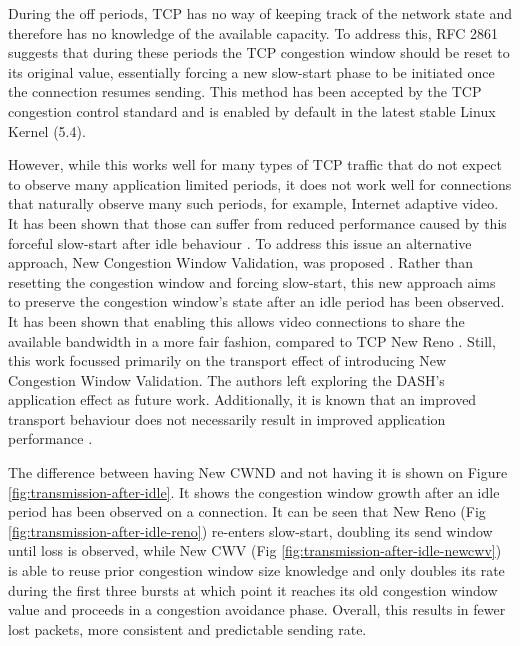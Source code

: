 \documentclass[10pt,sigconf]{acmart}
\begin{document}
During the off periods, TCP has no way of keeping track of the network state and therefore has no knowledge of the available capacity. To address this, RFC 2861 \cite{rfc2861-2000-padhye-congestion-window-validation} suggests that during these periods the TCP congestion window should be reset to its original value, essentially forcing a new slow-start phase to be initiated once the connection resumes sending. This method has been accepted by the TCP congestion control standard \cite{rfc5681-congeston-control} and is enabled by default in the latest stable Linux Kernel (5.4).

However, while this works well for many types of TCP traffic that do not expect to observe many application limited periods, it does not work well for connections that naturally observe many such periods, for example, Internet adaptive video. It has been shown that those can suffer from reduced performance caused by this forceful slow-start after idle behaviour \cite{Esteban-2012-Interactions-HTTP-TCP}. To address this issue an alternative approach, New Congestion Window Validation, was proposed \cite{rfc7661-2015-fairhurst-new-cwnd-validation}. Rather than resetting the congestion window and forcing slow-start, this new approach aims to preserve the congestion window's state after an idle period has been observed. It has been shown that enabling this allows video connections to share the available bandwidth in a more fair fashion, compared to TCP New Reno \cite{Nazir-2014-performance-evaluation-congestion-window-validation-dash-newcwv}. Still, this work focussed primarily on the transport effect of introducing New Congestion Window Validation. The authors left exploring the DASH's application effect as future work. Additionally, it is known that an improved transport behaviour does not necessarily result in improved application performance \cite{Spiteri-2016-BOLA}.

The difference between having New CWND and not having it is shown on Figure \ref{fig:transmission-after-idle}. It shows the congestion window growth after an idle period has been observed on a connection. It can be seen that New Reno (Fig \ref{fig:transmission-after-idle-reno}) re-enters slow-start, doubling its send window until loss is observed, while New CWV (Fig \ref{fig:transmission-after-idle-newcwv}) is able to reuse prior congestion window size knowledge and only doubles its rate during the first three bursts at which point it reaches its old congestion window value and proceeds in a congestion avoidance phase. Overall, this results in fewer lost packets, more consistent and predictable sending rate.
\end{document}

